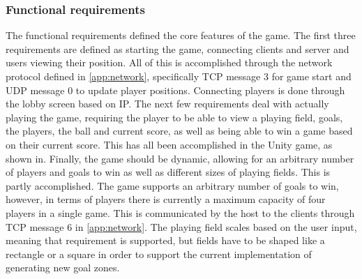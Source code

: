 \subsubsection{Functional requirements}
The functional requirements defined the core features of the game.
The first three requirements are defined as starting the game, connecting clients and server and users viewing their position.
All of this is accomplished through the network protocol defined in \autoref{app:network}, specifically TCP message 3 for game start and UDP message 0 to update player positions.
Connecting players is done through the lobby screen based on IP.
The next few requirements deal with actually playing the game, requiring the player to be able to view a playing field, goals, the players, the ball and current score, as well as being able to win a game based on their current score.
This has all been accomplished in the Unity game, as shown in.
Finally, the game should be dynamic, allowing for an arbitrary number of players and goals to win as well as different sizes of playing fields.
This is partly accomplished.
The game supports an arbitrary number of goals to win, however, in terms of players there is currently a maximum capacity of four players in a single game.
This is communicated by the host to the clients through TCP message 6 in \autoref{app:network}.
The playing field scales based on the user input, meaning that requirement is supported, but fields have to be shaped like a rectangle or a square in order to support the current implementation of generating new goal zones.

